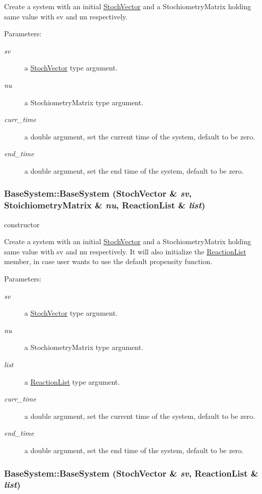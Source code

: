 Create a system with an initial \hyperlink{class_stoch_vector}{StochVector} and a StochiometryMatrix holding same value with sv and nu respectively. \begin{Desc}
\item[Parameters:]
\begin{description}
\item[{\em sv}]a \hyperlink{class_stoch_vector}{StochVector} type argument. \item[{\em nu}]a StochiometryMatrix type argument. \item[{\em curr\_\-time}]a double argument, set the current time of the system, default to be zero. \item[{\em end\_\-time}]a double argument, set the end time of the system, default to be zero. \end{description}
\end{Desc}
\hypertarget{class_base_system_b315499367770c8f34ca832c7692799e}{
\subsubsection{\setlength{\rightskip}{0pt plus 5cm}BaseSystem::BaseSystem ({\bf StochVector} \& {\em sv}, \/  {\bf StoichiometryMatrix} \& {\em nu}, \/  {\bf ReactionList} \& {\em list})}}
\label{class_base_system_b315499367770c8f34ca832c7692799e}


constructor 

Create a system with an initial \hyperlink{class_stoch_vector}{StochVector} and a StochiometryMatrix holding same value with sv and nu respectively. It will also initialize the \hyperlink{class_reaction_list}{ReactionList} member, in case user wants to use the default propensity function. \begin{Desc}
\item[Parameters:]
\begin{description}
\item[{\em sv}]a \hyperlink{class_stoch_vector}{StochVector} type argument. \item[{\em nu}]a StochiometryMatrix type argument. \item[{\em list}]a \hyperlink{class_reaction_list}{ReactionList} type argument. \item[{\em curr\_\-time}]a double argument, set the current time of the system, default to be zero. \item[{\em end\_\-time}]a double argument, set the end time of the system, default to be zero. \end{description}
\end{Desc}
\hypertarget{class_base_system_2aae59b374a42bf6926fa01f9a514e70}{
\subsubsection{\setlength{\rightskip}{0pt plus 5cm}BaseSystem::BaseSystem ({\bf StochVector} \& {\em sv}, \/  {\bf ReactionList} \& {\em list})}}
\label{class_base_system_2aae59b374a42bf6926fa01f9a514e70}


